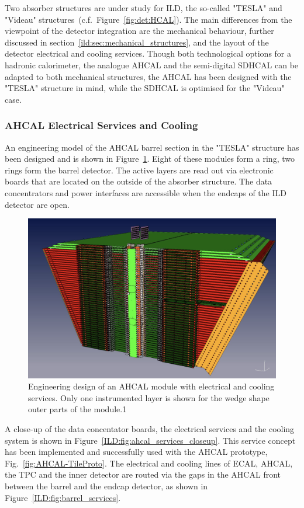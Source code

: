 Two absorber structures are under study for ILD, the so-called "TESLA" and "Videau" structures~(c.f.~Figure~\ref{fig:det:HCAL}). The main differences from the viewpoint of the detector integration are the mechanical behaviour, further discussed in section~\ref{ild:sec:mechanical_structures}, and the layout of the detector electrical and cooling services. Though both technological options for a hadronic calorimeter, the analogue AHCAL and the semi-digital SDHCAL can be adapted to both mechanical structures, the AHCAL has been designed with the "TESLA" structure in mind, while the SDHCAL is optimised for the "Videau" case.

\subsubsection{AHCAL Electrical Services and Cooling}
An engineering model of the AHCAL barrel section in the "TESLA" structure has been designed and is shown in Figure~\ref{ILD:fig:ahcal_module_services}. Eight of these modules form a ring, two rings form the barrel detector. The active layers are read out via electronic boards that are located on the outside of the absorber structure. The data concentrators and power interfaces are accessible when the endcaps of the ILD detector are open.  
\begin{figure}[h!]
    \centering
        \includegraphics[width=0.8\hsize]{Integration/fig/AHCAL_Module_Services.png}
    \caption{Engineering design of an AHCAL module with electrical and cooling services. Only one instrumented layer is shown for the wedge shape outer parts of the module.1}
    \label{ILD:fig:ahcal_module_services}
\end{figure}
A close-up of the data concentator boards, the electrical services and the cooling system is shown in Figure~\ref{ILD:fig:ahcal_services_closeup}. This service concept has been implemented and successfully used with the AHCAL prototype, Fig.~\ref{fig:AHCAL-TileProto}. The electrical and cooling lines of ECAL, AHCAL, the TPC and the inner detector are routed via the gaps in the AHCAL front between the barrel and the endcap detector, as shown in Figure~\ref{ILD:fig:barrel_services}. 
